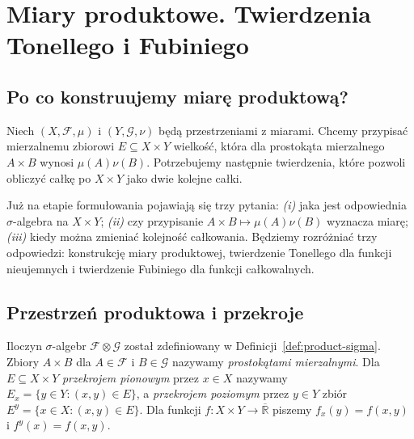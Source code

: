 \chapter{Miary produktowe. Twierdzenia Tonellego i Fubiniego}
\label{ch:produkty-miary}

\section{Po co konstruujemy miarę produktową?}

Niech $(X,\mathcal F,\mu)$ i $(Y,\mathcal G,\nu)$ będą
przestrzeniami z miarami. Chcemy przypisać mierzalnemu
zbiorowi $E\subseteq X\times Y$ wielkość, która dla
prostokąta mierzalnego $A\times B$ wynosi $\mu(A)\nu(B)$.
Potrzebujemy następnie twierdzenia, które pozwoli obliczyć
całkę po $X\times Y$ jako dwie kolejne całki.

Już na etapie formułowania pojawiają się trzy pytania:
\emph{(i)} jaka jest odpowiednia $\sigma$-algebra
na $X\times Y$; \emph{(ii)} czy przypisanie
$A\times B\mapsto\mu(A)\nu(B)$ wyznacza miarę;
\emph{(iii)} kiedy można zmieniać kolejność całkowania.
Będziemy rozróżniać trzy odpowiedzi: konstrukcję miary
produktowej, twierdzenie Tonellego dla funkcji nieujemnych
i twierdzenie Fubiniego dla funkcji całkowalnych.

\section{Przestrzeń produktowa i przekroje}

Iloczyn $\sigma$-algebr $\mathcal F\otimes\mathcal G$
został zdefiniowany w Definicji~\ref{def:product-sigma}.
Zbiory $A\times B$ dla $A\in\mathcal F$ i $B\in\mathcal G$
nazywamy \emph{prostokątami mierzalnymi}.
Dla $E\subseteq X\times Y$ \emph{przekrojem pionowym}
przez $x\in X$ nazywamy $E_x=\{y\in Y:(x,y)\in E\}$,
a \emph{przekrojem poziomym} przez $y\in Y$ zbiór
$E^y=\{x\in X:(x,y)\in E\}$.
Dla funkcji $f:X\times Y\to\overline{\mathbb R}$ piszemy
$f_x(y)=f(x,y)$ i $f^y(x)=f(x,y)$.

